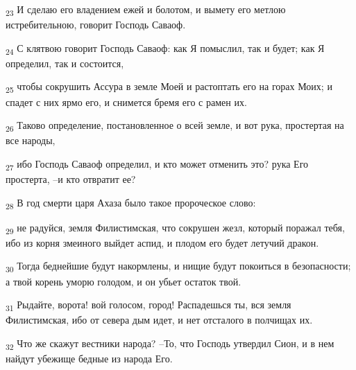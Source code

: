 \begin{tcolorbox}
\textsubscript{23} И сделаю его владением ежей и болотом, и вымету его метлою истребительною, говорит Господь Саваоф.
\end{tcolorbox}
\begin{tcolorbox}
\textsubscript{24} С клятвою говорит Господь Саваоф: как Я помыслил, так и будет; как Я определил, так и состоится,
\end{tcolorbox}
\begin{tcolorbox}
\textsubscript{25} чтобы сокрушить Ассура в земле Моей и растоптать его на горах Моих; и спадет с них ярмо его, и снимется бремя его с рамен их.
\end{tcolorbox}
\begin{tcolorbox}
\textsubscript{26} Таково определение, постановленное о всей земле, и вот рука, простертая на все народы,
\end{tcolorbox}
\begin{tcolorbox}
\textsubscript{27} ибо Господь Саваоф определил, и кто может отменить это? рука Его простерта, --и кто отвратит ее?
\end{tcolorbox}
\begin{tcolorbox}
\textsubscript{28} В год смерти царя Ахаза было такое пророческое слово:
\end{tcolorbox}
\begin{tcolorbox}
\textsubscript{29} не радуйся, земля Филистимская, что сокрушен жезл, который поражал тебя, ибо из корня змеиного выйдет аспид, и плодом его будет летучий дракон.
\end{tcolorbox}
\begin{tcolorbox}
\textsubscript{30} Тогда беднейшие будут накормлены, и нищие будут покоиться в безопасности; а твой корень уморю голодом, и он убьет остаток твой.
\end{tcolorbox}
\begin{tcolorbox}
\textsubscript{31} Рыдайте, ворота! вой голосом, город! Распадешься ты, вся земля Филистимская, ибо от севера дым идет, и нет отсталого в полчищах их.
\end{tcolorbox}
\begin{tcolorbox}
\textsubscript{32} Что же скажут вестники народа? --То, что Господь утвердил Сион, и в нем найдут убежище бедные из народа Его.
\end{tcolorbox}
